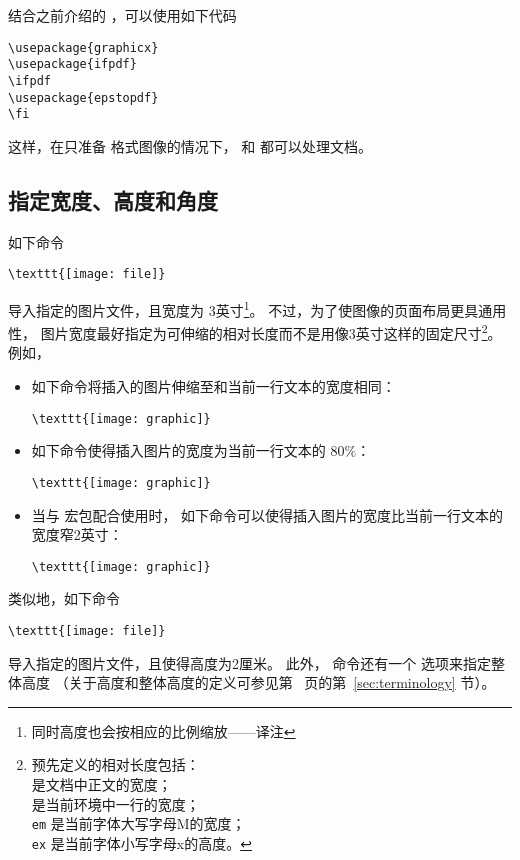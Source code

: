 结合之前介绍的 ，可以使用如下代码
\begin{lstlisting}
\usepackage{graphicx}
\usepackage{ifpdf}
\ifpdf
\usepackage{epstopdf}
\fi
\end{lstlisting}
这样，在只准备  格式图像的情况下，
 和  都可以处理文档。

\subsection{指定宽度、高度和角度}\label{ssec:spec-width-height-angle}
如下命令
\begin{lstlisting}
\texttt{[image: file]}
\end{lstlisting}
导入指定的图片文件，且宽度为 3英寸\footnote{
    同时高度也会按相应的比例缩放——译注}。
不过，为了使图像的页面布局更具通用性，
图片宽度最好指定为可伸缩的相对长度而不是用像3英寸这样的固定尺寸\footnote{
	预先定义的相对长度包括：\\
	 是文档中正文的宽度；\\
	 是当前环境中一行的宽度；\\
	\texttt{em} 是当前字体大写字母M的宽度；\\
	\texttt{ex} 是当前字体小写字母x的高度。}。
例如，
\begin{itemize}
	\item 如下命令将插入的图片伸缩至和当前一行文本的宽度相同：
\begin{lstlisting}
\texttt{[image: graphic]}
\end{lstlisting}
	\item 如下命令使得插入图片的宽度为当前一行文本的 $80\percent$：
\begin{lstlisting}
\texttt{[image: graphic]}
\end{lstlisting}
	\item 当与  宏包配合使用时，
	如下命令可以使得插入图片的宽度比当前一行文本的宽度窄2英寸：
\begin{lstlisting}
\texttt{[image: graphic]}
\end{lstlisting}
	
\end{itemize}

类似地，如下命令
\begin{lstlisting}
\texttt{[image: file]}
\end{lstlisting}
导入指定的图片文件，且使得高度为2厘米。
此外， 命令还有一个  选项来指定整体高度
（关于高度和整体高度的定义可参见第~\pageref{sec:terminology} 页的第~\ref{sec:terminology} 节）。

